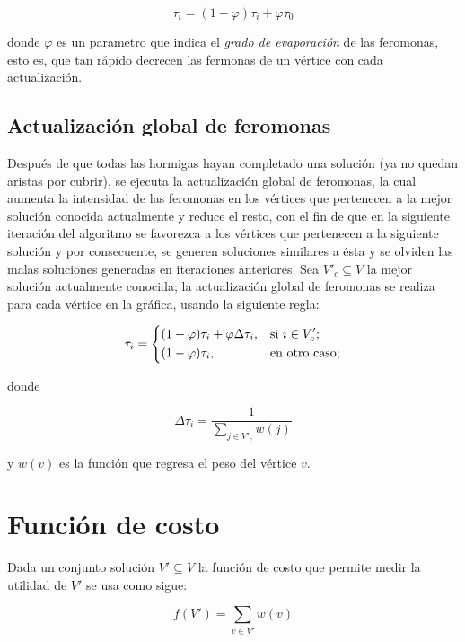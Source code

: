 \documentclass[12pt, letterpaper]{article}
\begin{document}
\begin{equation}
    \tau_i=(1-\varphi)\tau_i + \varphi\tau_0
\end{equation}

\noindent
donde $\varphi$ es un parametro que indica el \textit{grado de evaporación} de las feromonas, esto es, que tan rápido decrecen las fermonas de un vértice con cada actualización.

\subsection{Actualización global de feromonas}
Después de que todas las hormigas hayan completado una solución (ya no quedan aristas por cubrir), se ejecuta la actualización global de feromonas, la cual aumenta la intensidad de las feromonas en los vértices que pertenecen a la mejor solución conocida actualmente y reduce el resto, con el fin de que en la siguiente iteración del algoritmo se favorezca a los vértices que pertenecen a la siguiente solución y por consecuente, se generen soluciones similares a ésta y se olviden las malas soluciones generadas en iteraciones anteriores. Sea $V'_c \subseteq V$ la mejor solución actualmente conocida; la actualización global de feromonas se realiza para cada vértice en la gráfica, usando la siguiente regla:

\begin{equation}
    \tau_i = \begin{dcases}
        (1-\varphi)\tau_i+\varphi\Delta\tau_i, & \text{si } i \in V'_c;\\
        (1-\varphi)\tau_i, & \text{en otro caso};
    \end{dcases}
\end{equation}

\noindent
donde

\begin{equation}
    \Delta\tau_i = \frac{1}{\sum_{j \in V'_c}{w(j)}}
\end{equation}

\noindent
y $w(v)$ es la función que regresa el peso del vértice $v$.

\section{Función de costo}
Dada un conjunto solución $V' \subseteq V$ la función de costo que permite medir la utilidad de $V'$ se usa como sigue:

\begin{equation}
    f(V') = \sum_{v \in V'}w(v)
\end{equation}
\end{document}
